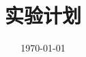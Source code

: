 \documentclass[oneside]{ctexbook}
\begin{document}
  \frontmatter
  \title{\Huge\bfseries 实验计划}
  \author{}
  \date{\today}
  \maketitle

  \tableofcontents

  \mainmatter
  

  \backmatter

  
\end{document}
